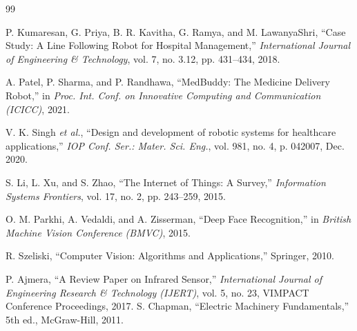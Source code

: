 \begin{thebibliography}{99}

P. Kumaresan, G. Priya, B. R. Kavitha, G. Ramya, and M. LawanyaShri,
``Case Study: A Line Following Robot for Hospital Management,''
\textit{International Journal of Engineering \& Technology},
vol. 7, no. 3.12, pp. 431--434, 2018.

A. Patel, P. Sharma, and P. Randhawa,
``MedBuddy: The Medicine Delivery Robot,''
in \textit{Proc. Int. Conf. on Innovative Computing and Communication (ICICC)},
2021.

V. K. Singh \textit{et al.},
``Design and development of robotic systems for healthcare applications,''
\textit{IOP Conf. Ser.: Mater. Sci. Eng.},
vol. 981, no. 4, p. 042007, Dec. 2020.

S. Li, L. Xu, and S. Zhao,
``The Internet of Things: A Survey,''
\textit{Information Systems Frontiers},
vol. 17, no. 2, pp. 243--259, 2015.

O. M. Parkhi, A. Vedaldi, and A. Zisserman,
``Deep Face Recognition,''
in \textit{British Machine Vision Conference (BMVC)},
2015.

R. Szeliski,
``Computer Vision: Algorithms and Applications,''
Springer, 2010.

P. Ajmera,
``A Review Paper on Infrared Sensor,''
\textit{International Journal of Engineering Research \& Technology (IJERT)},
vol. 5, no. 23, VIMPACT Conference Proceedings, 2017.
S. Chapman,
``Electric Machinery Fundamentals,''
5th ed., McGraw-Hill, 2011.

\end{thebibliography}